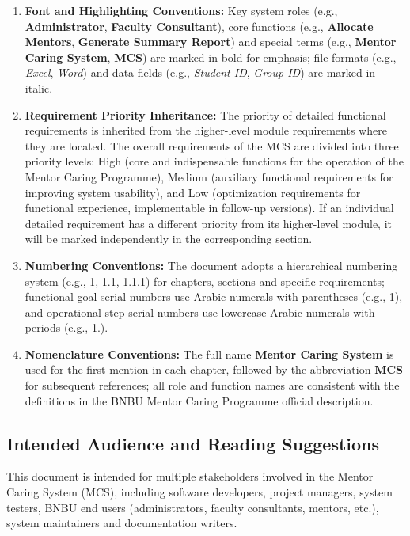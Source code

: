 \documentclass[a4paper,12pt]{article}
\begin{document}
\begin{enumerate}
\item \textbf{Font and Highlighting Conventions:} Key system roles (e.g., \textbf{Administrator}, \textbf{Faculty Consultant}), core functions (e.g., \textbf{Allocate Mentors}, \textbf{Generate Summary Report}) and special terms (e.g., \textbf{Mentor Caring System}, \textbf{MCS}) are marked in bold for emphasis; file formats (e.g., \textit{Excel}, \textit{Word}) and data fields (e.g., \textit{Student ID}, \textit{Group ID}) are marked in italic.

\item \textbf{Requirement Priority Inheritance:} The priority of detailed functional requirements is inherited from the higher-level module requirements where they are located. The overall requirements of the MCS are divided into three priority levels: High (core and indispensable functions for the operation of the Mentor Caring Programme), Medium (auxiliary functional requirements for improving system usability), and Low (optimization requirements for functional experience, implementable in follow-up versions). If an individual detailed requirement has a different priority from its higher-level module, it will be marked independently in the corresponding section.

\item \textbf{Numbering Conventions:} The document adopts a hierarchical numbering system (e.g., 1, 1.1, 1.1.1) for chapters, sections and specific requirements; functional goal serial numbers use Arabic numerals with parentheses (e.g., 1), and operational step serial numbers use lowercase Arabic numerals with periods (e.g., 1.).

\item \textbf{Nomenclature Conventions:} The full name \textbf{Mentor Caring System} is used for the first mention in each chapter, followed by the abbreviation \textbf{MCS} for subsequent references; all role and function names are consistent with the definitions in the BNBU Mentor Caring Programme official description.
\end{enumerate}

\subsection{Intended Audience and Reading Suggestions}

This document is intended for multiple stakeholders involved in the Mentor Caring System (MCS), including software developers, project managers, system testers, BNBU end users (administrators, faculty consultants, mentors, etc.), system maintainers and documentation writers.
\end{document}

